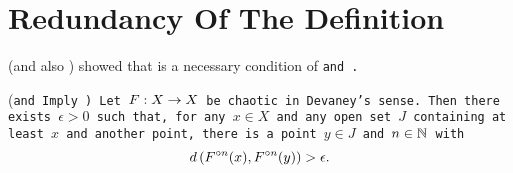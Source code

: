 \documentclass[12pt,draft,twoside]{book}
\begin{document}

\section{Redundancy Of The Definition}
\citet{silverman} (and also \citet{banks}) showed that \sdic is a necessary condition of \tt and \dpp.
\begin{theorem}
  (\tt and \dpp Imply \sdic)
  Let $F: X\rightarrow X$ be chaotic in Devaney's sense.
  Then there exists $\epsilon > 0$ such that, for any $x\in X$ and any open set $J$ containing at least $x$ and another point, there is a point $y\in J$ and $n\in \mathbb{N}$ with
  \begin{equation*}
    d\left( F^{\circ n}(x),F^{\circ n}(y) \right) > \epsilon.
  \end{equation*}
  \label{thm:silverman}
\end{theorem}
\end{document}
